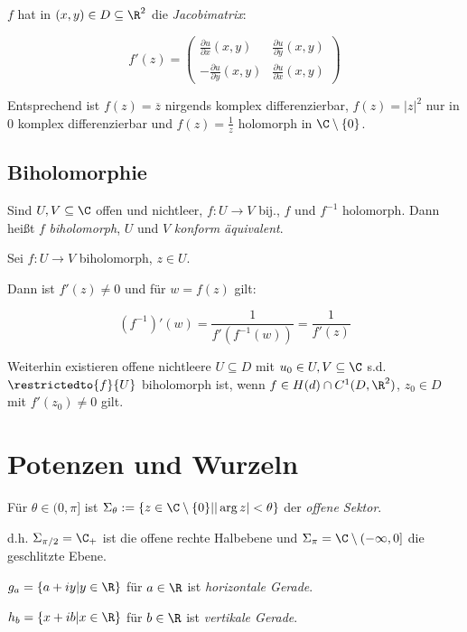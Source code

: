 \(f\) hat in \((x,y) \in D \subseteq \R^2\) die \emph{Jacobimatrix}:

\[ f'(z) = \begin{pmatrix}
	\frac{\partial u}{\partial x}(x,y) & \frac{\partial u}{\partial y}(x,y) \\
	-\frac{\partial u}{\partial y}(x,y) & \frac{\partial u}{\partial x}(x,y)
\end{pmatrix} \]

Entsprechend ist \(f(z)=\overline z\) nirgends komplex differenzierbar, \(f(z)=|z|^2\) nur in \(0\) komplex differenzierbar und \(f(z) = \frac{1}{z}\) holomorph in \(\C \setminus \{0\}\).

\subsection*{Biholomorphie}

Sind \(U, V \subseteq \C\) offen und nichtleer, \(f : U \to V\) bij., \(f\) und \(f^{-1}\) holomorph. Dann heißt \(f\) \emph{biholomorph}, \(U\) und \(V\) \emph{konform äquivalent}.

Sei \(f : U \to V\) biholomorph, \(z \in U\).

Dann ist \(f'(z) \neq 0\) und für \(w = f(z)\) gilt:

\vspace*{-2mm}
\[ (f^{-1})'(w) = \frac{1}{f'(f^{-1}(w))} = \frac{1}{f'(z)} \]

Weiterhin existieren offene nichtleere \(U \subseteq D\) mit \(u_0 \in U, V \subseteq \C\) s.d. \(\restrictedto{f}{U}\) biholomorph ist, wenn \(f \in H(d) \cap C^1(D,\R^2)\), \(z_0 \in D\) mit \(f'(z_0) \neq 0\) gilt.

\section*{Potenzen und Wurzeln}

Für \(\theta \in (0, \pi]\) ist \(\Sigma_\theta := \{ z \in \C \setminus \{0\} | |\arg z| < \theta \}\) der \emph{offene Sektor}.

d.h. \(\Sigma_{\pi / 2} = \C_+\) ist die offene rechte Halbebene und \(\Sigma_\pi = \C \setminus (-\infty,0]\) die geschlitzte Ebene.

\vspace*{2mm}

\(g_a = \{ a + iy | y \in \R \}\) für \(a \in \R\) ist \emph{horizontale Gerade}.

		\(h_b = \{ x + ib | x \in \R \}\) für \(b \in \R\) ist \emph{vertikale Gerade}.

